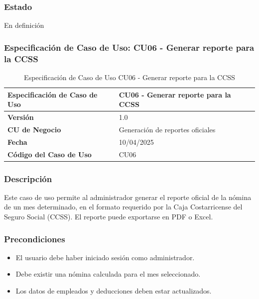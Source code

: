 \subsubsection*{Estado}
En definición

\subsubsection*{Especificación de Caso de Uso: CU06 - Generar reporte para la CCSS}

\begin{table}[h]
	\centering
	\caption{Especificación de Caso de Uso CU06 - Generar reporte para la CCSS}
	\begin{tabular}{|p{5cm}|p{9cm}|}
		\hline
		\textbf{Especificación de Caso de Uso} & CU06 - Generar reporte para la CCSS \\ \hline
		\textbf{Versión}                       & 1.0                                 \\ \hline
		\textbf{CU de Negocio}                 & Generación de reportes oficiales    \\ \hline
		\textbf{Fecha}                         & 10/04/2025                          \\ \hline
		\textbf{Código del Caso de Uso}        & CU06                                \\ \hline
	\end{tabular}
\end{table}

\subsubsection*{Descripción}
Este caso de uso permite al administrador generar el reporte oficial de la nómina de un mes determinado, en el formato requerido por la Caja Costarricense del Seguro Social (CCSS). El reporte puede exportarse en PDF o Excel.

\subsubsection*{Precondiciones}
\begin{itemize}
	\item El usuario debe haber iniciado sesión como administrador.
	\item Debe existir una nómina calculada para el mes seleccionado.
	\item Los datos de empleados y deducciones deben estar actualizados.
\end{itemize}

